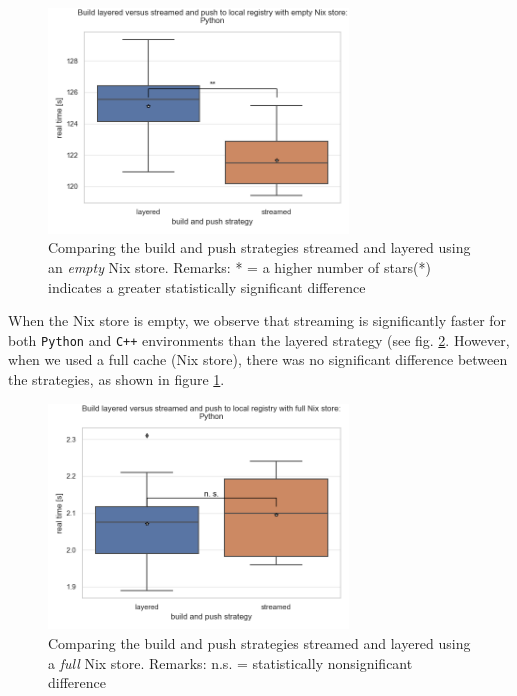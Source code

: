 \begin{figure}[h!]
  \centering
  \includegraphics[width=0.71\textwidth]{thesis/graphics/biar-plots/build_layered_versus_streamed_and_push_to_local_registry_with_empty_nix_store:_python.png}
  \caption{Comparing the build and push strategies streamed and layered using an \emph{empty} Nix store. Remarks: * = a higher number of stars(*) indicates a greater statistically significant difference}
  \label{fig:biar-layered-vs-streamed-full-store-python}
\end{figure}

When the Nix store is empty, we observe that streaming is significantly faster for both \verb|Python| and \verb|C++| environments than the layered strategy (see fig. \ref{fig:biar-layered-vs-streamed-empty-store-python}. However, when we used a full cache (Nix store), there was no significant difference between the strategies, as shown in figure \ref{fig:biar-layered-vs-streamed-full-store-python}.

\begin{figure}[h!]
    \centering
  \includegraphics[width=0.71\textwidth]{thesis/graphics/biar-plots/build_layered_versus_streamed_and_push_to_local_registry_with_full_nix_store:_python.png}
  \caption{Comparing the build and push strategies streamed and layered using a \emph{full} Nix store.
  Remarks: n.s. = statistically nonsignificant difference}
  \label{fig:biar-layered-vs-streamed-empty-store-python}
\end{figure}

